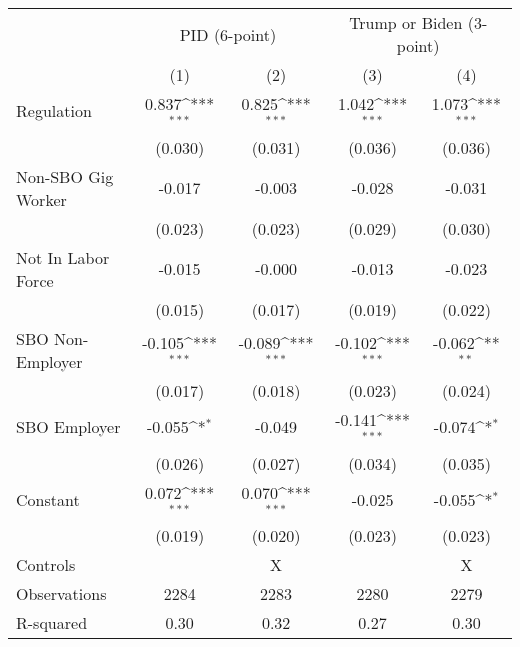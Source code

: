{
\def\sym#1{\ifmmode^{#1}\else\(^{#1}\)\fi}
\begin{tabular}{l*{4}{c}}
\hline\hline
                    &\multicolumn{2}{c}{PID (6-point)}          &\multicolumn{2}{c}{Trump or Biden (3-point)}\\
                    &\multicolumn{1}{c}{(1)}         &\multicolumn{1}{c}{(2)}         &\multicolumn{1}{c}{(3)}         &\multicolumn{1}{c}{(4)}         \\
\hline
Regulation          &       0.837\sym{***}&       0.825\sym{***}&       1.042\sym{***}&       1.073\sym{***}\\
                    &     (0.030)         &     (0.031)         &     (0.036)         &     (0.036)         \\
Non-SBO Gig Worker  &      -0.017         &      -0.003         &      -0.028         &      -0.031         \\
                    &     (0.023)         &     (0.023)         &     (0.029)         &     (0.030)         \\
Not In Labor Force  &      -0.015         &      -0.000         &      -0.013         &      -0.023         \\
                    &     (0.015)         &     (0.017)         &     (0.019)         &     (0.022)         \\
SBO Non-Employer    &      -0.105\sym{***}&      -0.089\sym{***}&      -0.102\sym{***}&      -0.062\sym{**} \\
                    &     (0.017)         &     (0.018)         &     (0.023)         &     (0.024)         \\
SBO Employer        &      -0.055\sym{*}  &      -0.049         &      -0.141\sym{***}&      -0.074\sym{*}  \\
                    &     (0.026)         &     (0.027)         &     (0.034)         &     (0.035)         \\
Constant            &       0.072\sym{***}&       0.070\sym{***}&      -0.025         &      -0.055\sym{*}  \\
                    &     (0.019)         &     (0.020)         &     (0.023)         &     (0.023)         \\
\hline
Controls            &                     &           X         &                     &           X         \\
Observations        &        2284         &        2283         &        2280         &        2279         \\
R-squared           &        0.30         &        0.32         &        0.27         &        0.30         \\
\hline\hline
\end{tabular}
}
